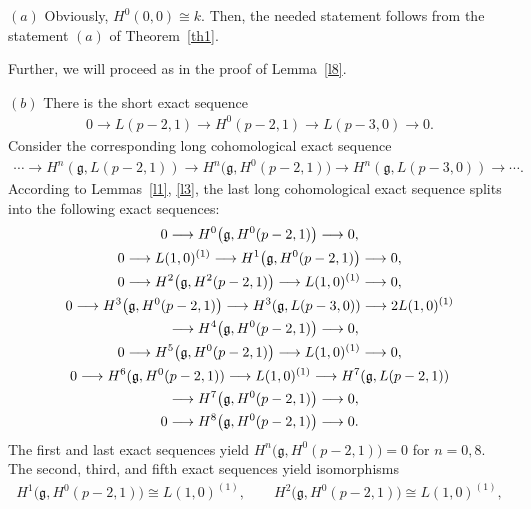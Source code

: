 \documentclass[pdftex]{sigma}%
\numberwithin{equation}{section}
\begin{document}
 $(a)$ Obviously, $H^0(0,0)\cong k$. Then, the needed statement follows from the statement $(a)$ of Theorem~\ref{th1}.


Further, we will proceed as in the proof of Lemma~\ref{l8}.

$(b)$ There is the short exact sequence
\begin{gather*}
0\longrightarrow L(p-2,1)\longrightarrow H^0(p-2,1)\longrightarrow L(p-3,0)\longrightarrow 0.
\end{gather*}
Consider the corresponding long cohomological exact sequence
\begin{gather*}
\cdots \longrightarrow H^n(\mathfrak{g},L(p-2,1))\longrightarrow H^n\big(\mathfrak{g},H^0(p-2,1)\big)\longrightarrow
H^n(\mathfrak{g},L(p-3,0))\longrightarrow \cdots.
\end{gather*}
According to Lemmas~\ref{l1}, \ref{l3}, the last long cohomological exact sequence splits into the following exact sequences:
\begin{gather*}
0\longrightarrow H^0\big(\mathfrak{g},H^0(p-2,1)\big)\longrightarrow 0,
\\
0\longrightarrow L(1,0)^{(1)}\longrightarrow H^1\big(\mathfrak{g},H^0(p-2,1)\big)\longrightarrow 0,
\\
0\longrightarrow H^2\big(\mathfrak{g},H^2(p-2,1)\big)\longrightarrow L(1,0)^{(1)}\longrightarrow 0,
\\
0\longrightarrow H^3\big(\mathfrak{g},H^0(p-2,1)\big)\longrightarrow H^3(\mathfrak{g},L(p-3,0))\longrightarrow 2L(1,0)^{(1)}
\\ \hphantom{0}
{}\longrightarrow
H^4\big(\mathfrak{g},H^0(p-2,1)\big)\longrightarrow 0,
\\
0\longrightarrow H^5\big(\mathfrak{g},H^0(p-2,1)\big)\longrightarrow L(1,0)^{(1)}\longrightarrow 0,
\\
0\longrightarrow H^6(\mathfrak{g},H^0(p-2,1))\longrightarrow L(1,0)^{(1)}\longrightarrow H^7(\mathfrak{g},L(p-2,1))
\\ \hphantom{0}
{}\longrightarrow
H^7\big(\mathfrak{g},H^0(p-2,1)\big)\longrightarrow 0,
\\
0\longrightarrow H^8\big(\mathfrak{g},H^0(p-2,1)\big)\longrightarrow 0.
\end{gather*}
The first and last exact sequences yield $H^n\big(\mathfrak{g},H^0(p-2,1)\big)=0$ for $n=0,8$. The second, third, and fifth exact sequences yield isomorphisms
\begin{gather*}
H^1\big(\mathfrak{g},H^0(p-2,1)\big)\cong L(1,0)^{(1)},
\qquad
H^2\big(\mathfrak{g},H^0(p-2,1)\big)\cong L(1,0)^{(1)},
\end{gather*}
\end{document}
